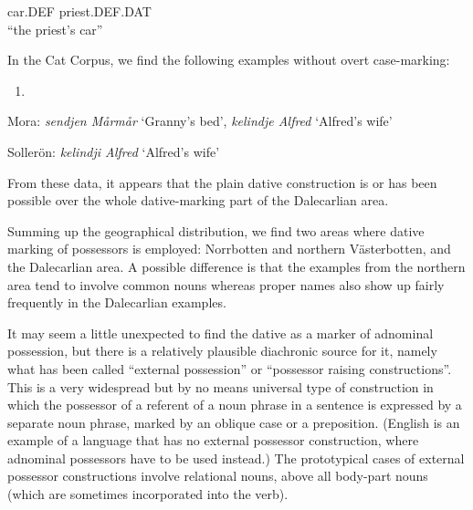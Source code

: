 car.DEF  priest.DEF.DAT\\ %


“the priest’s car”
\z


In the Cat Corpus, we find the following examples without overt case-marking:


\begin{enumerate} %
\item 
\end{enumerate} %
Mora: \textit{sendjen Mårmår} ‘Granny’s bed’, \textit{kelindje Alfred }‘Alfred’s wife’

Sollerön: \textit{kelindji Alfred} ‘Alfred’s wife’

From these data, it appears that the plain dative construction is or has been possible over the whole dative-marking part of the Dalecarlian area. 

Summing up the geographical distribution, we find two areas where dative marking of possessors is employed: Norrbotten and northern Västerbotten, and the Dalecarlian area. A possible difference is that the examples from the northern area tend to involve common nouns whereas proper names also show up fairly frequently in the Dalecarlian examples. 

It may seem a little unexpected to find the dative as a marker of adnominal possession, but there is a relatively plausible diachronic source for it, namely what has been called “external possession” or “possessor raising constructions”. This is a very widespread but by no means universal type of construction in which the possessor of a referent of a noun phrase in a sentence is expressed by a separate noun phrase, marked by an oblique case or a preposition. (English is an example of a language that has no external possessor construction, where adnominal possessors have to be used instead.) The prototypical cases of external possessor constructions involve relational nouns, above all body-part nouns (which are sometimes incorporated into the verb).

